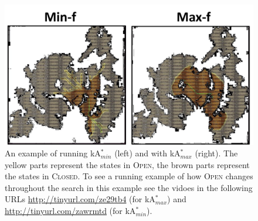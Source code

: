 \documentclass{aicom2e}
\newcommand{\astar}{A$^*$}
\newcommand{\kastar}{kA$^*$}
\newcommand{\kastarmin}{kA$^*_{min}$}
\newcommand{\kastarmax}{kA$^*_{max}$}
\newcommand{\kxastar}{k$\times$A$^*$}
\newcommand{\open}{\textsc{Open}}
\newcommand{\closed}{\textsc{Closed}}
\begin{document}


\begin{figure}
    \includegraphics[width=\columnwidth]{min-vs-max}
    \caption{An example of running \kastarmin{} (left) and with \kastarmax{} (right). The yellow parts represent the states in \open{}, the brown parts represent the states in \closed{}.
    To see a running example of how \open{} changes throughout the search in  this example see the vidoes in the following URLs \url{http://tinyurl.com/ze29tb4} (for \kastarmax) and
    \url{http://tinyurl.com/zawrmtd} (for \kastarmin).
}
    \label{fig:min-vs-max}
\end{figure}
\end{document}
